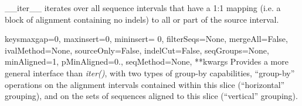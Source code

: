 \documentclass{howto}
\begin{document}
\begin{funcdesc}{__iter__}{}
  iterates over all sequence intervals that have
  a 1:1 mapping (i.e. a block of alignment containing no indels) to
  all or part of the source interval.
\end{funcdesc}


\begin{funcdesc}{keys}{maxgap=0, maxinsert=0, mininsert= 0, filterSeqs=None, mergeAll=False, ivalMethod=None, sourceOnly=False, indelCut=False, seqGroups=None, minAligned=1, pMinAligned=0., seqMethod=None, **kwargs}
  Provides a more general interface than {\em iter()}, with two types of 
  group-by capabilities, ``group-by'' operations on the alignment intervals
  contained within this slice (``horizontal'' grouping), 
  and on the sets of sequences aligned
  to this slice (``vertical'' grouping).


\end{funcdesc}
\end{document}
